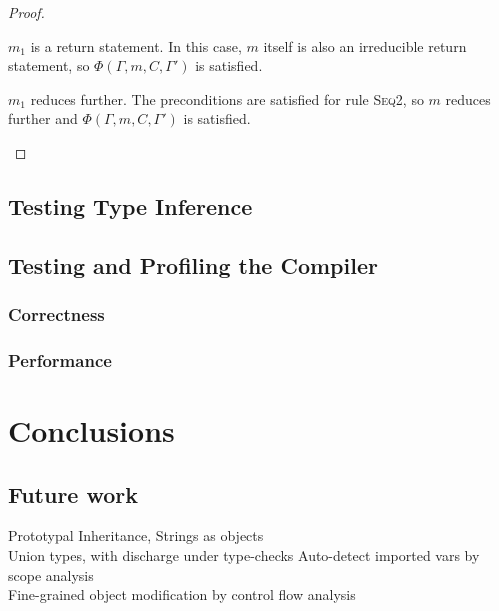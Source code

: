 \documentclass[12pt,a4paper,twoside,openright]{report}
\theoremstyle{definition}
\theoremstyle{dotless}
\newcommand{\indHyp}{\Phi(\Gamma, m, C, \Gamma')}
\begin{document}
\begin{proof}
\begin{case}[SeqTypable]
	\begin{subcase}
	  $m_1$ is a return statement.
	  In this case, $m$ itself is also an irreducible return statement, so
	  $\indHyp$ is satisfied. 
	\end{subcase}

	\begin{subcase}
	  $m_1$ reduces further.
	  The preconditions are satisfied for rule \textsc{Seq2}, so $m$ reduces
	  further and $\indHyp$ is satisfied.
	\end{subcase}

  \end{case}
\end{proof}


\section{Testing Type Inference}

\section{Testing and Profiling the Compiler}
\subsection*{Correctness}
\subsection*{Performance}

\chapter{Conclusions}
\section{Future work}
Prototypal Inheritance, Strings as objects \\
Union types, with discharge under type-checks
Auto-detect imported vars by scope analysis \\
Fine-grained object modification by control flow analysis

\printbibliography{}
\end{document}
